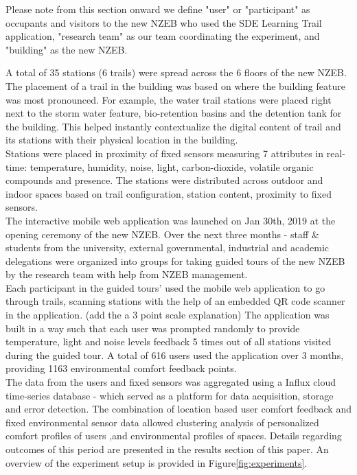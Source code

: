 
Please note from this section onward we define "user" or "participant" as occupants and visitors to the new NZEB who used the SDE Learning Trail application, "research team" as our team coordinating the experiment, and "building" as the new NZEB. 

A total of 35 stations (6 trails) were spread across the 6 floors of the new NZEB. The placement of a trail in the building was based on where the building feature was most pronounced. For example, the water trail stations were placed right next to the storm water feature, bio-retention basins and the detention tank for the building. This helped instantly contextualize the digital content of trail and its stations with their physical location in the building.\\

Stations were placed in proximity of fixed sensors measuring 7 attributes in real-time: temperature, humidity, noise, light, carbon-dioxide, volatile organic compounds and presence. The stations were distributed across outdoor and indoor spaces based on trail configuration, station content, proximity to fixed sensors.\\

The interactive mobile web application was launched on Jan 30th, 2019 at the opening ceremony of the new NZEB. Over the next three months - staff \& students from the university, external governmental, industrial and academic delegations were organized into groups for taking guided tours of the new NZEB by the research team with help from NZEB management.\\

Each participant in the guided tours' used the mobile web application to go through trails, scanning stations with the help of an embedded QR code scanner in the application. (add the a 3 point scale explanation) The application was built in a way such that each user was prompted randomly to provide temperature, light and noise levels feedback 5 times out of all stations visited during the guided tour. A total of 616 users used the application over 3 months, providing 1163 environmental comfort feedback points.\\

The data from the users and fixed sensors was aggregated using a Influx cloud time-series database - which served as a platform for data acquisition, storage and error detection. The combination of location based user comfort feedback and fixed environmental sensor data allowed clustering analysis of personalized comfort profiles of users ,and environmental profiles of spaces. Details regarding outcomes of this period are presented in the results section of this paper. An overview of the experiment setup is provided in Figure\ref{fig:experiments}.\\



